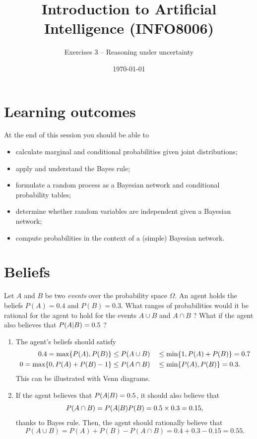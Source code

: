 \documentclass[11pt, a4paper]{article}
\title{Introduction to Artificial Intelligence (INFO8006)}
\subtitle{Exercises 3 -- Reasoning under uncertainty}
\date{\today}
\begin{document}
\maketitle

\section*{Learning outcomes}

At the end of this session you should be able to
\begin{itemize}[noitemsep]
    \item calculate marginal and conditional probabilities given joint distributions;
    \item apply and understand the Bayes rule;
    \item formulate a random process as a Bayesian network and conditional probability tables;
    \item determine whether random variables are independent given a Bayesian network;
    \item compute probabilities in the context of a (simple) Bayesian network.
\end{itemize}

\section{Beliefs}

Let $A$ and $B$ be two \emph{events} over the probability space $\Omega$. An agent holds the beliefs $P(A) = 0.4$ and $P(B) = 0.3$. What ranges of probabilities would it be rational for the agent to hold for the events $A \cup B$ and $A \cap B$ ? What if the agent also believes that $P(A \vert B) = 0.5$ ?

\begin{solution}
    \begin{enumerate}
        \item The agent's beliefs should satisfy
        \begin{alignat*}{2}
            0.4 = \max \{P(A), P(B)\} & \leq P(A \cup B) && \leq \min \{1, P(A) + P(B)\} = 0.7 \\
            0 = \max \{0, P(A) + P(B) - 1\} & \leq P(A \cap B) && \leq \min \{P(A), P(B)\} = 0.3 .
        \end{alignat*}
        This can be illustrated with Venn diagrams.

        \item If the agent believes that $P(A \vert B) = 0.5$, it should also believe that
        \begin{equation*}
            P(A \cap B) = P(A \vert B) P(B) = 0.5 \times 0.3 = 0.15,
        \end{equation*}
        thanks to Bayes rule. Then, the agent should rationally believe that
        \begin{equation*}
            P(A \cup B) = P(A) + P(B) - P(A \cap B) = 0.4 + 0.3 - 0.15 = 0.55.
        \end{equation*}
    \end{enumerate}
\end{solution}
\end{document}
